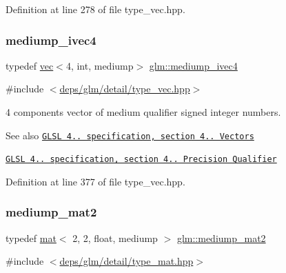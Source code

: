 Definition at line 278 of file type\+\_\+vec.\+hpp.

\mbox{\label{group__core__precision_gada31c3570b58a80e616c7245726a210d}} 
\subsubsection{\texorpdfstring{mediump\+\_\+ivec4}{mediump\_ivec4}}
{\footnotesize\ttfamily typedef \hyperlink{structglm_1_1vec}{vec}$<$4, int, mediump$>$ \hyperlink{group__core__precision_gada31c3570b58a80e616c7245726a210d}{glm\+::mediump\+\_\+ivec4}}



{\ttfamily \#include $<$\hyperlink{type__vec_8hpp}{deps/glm/detail/type\+\_\+vec.\+hpp}$>$}

4 components vector of medium qualifier signed integer numbers.

\begin{DoxySeeAlso}{See also}
\href{http://www.opengl.org/registry/doc/GLSLangSpec.4.20.8.pdf}{\tt G\+L\+SL 4.. specification, section 4.. Vectors} 

\href{http://www.opengl.org/registry/doc/GLSLangSpec.4.20.8.pdf}{\tt G\+L\+SL 4.. specification, section 4.. Precision Qualifier} 
\end{DoxySeeAlso}


Definition at line 377 of file type\+\_\+vec.\+hpp.

\mbox{\label{group__core__precision_ga698131fdb127cb55e8b70cc1b2c4ff67}} 
\subsubsection{\texorpdfstring{mediump\+\_\+mat2}{mediump\_mat2}}
{\footnotesize\ttfamily typedef \hyperlink{structglm_1_1mat}{mat}$<$ 2, 2, float, mediump $>$ \hyperlink{group__core__precision_ga698131fdb127cb55e8b70cc1b2c4ff67}{glm\+::mediump\+\_\+mat2}}



{\ttfamily \#include $<$\hyperlink{type__mat_8hpp}{deps/glm/detail/type\+\_\+mat.\+hpp}$>$}

